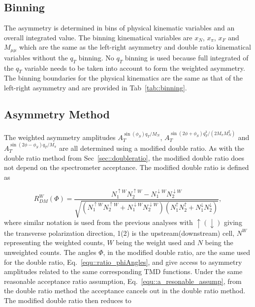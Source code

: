\subsection{Binning}
The asymmetry is determined in bins of physical kinematic variables and an
overall integrated value.  The binning kinematical variables are $x_N$, $x_\pi$,
$x_F$ and $M_{\mu\mu}$ which are the same as the left-right asymmetry and double
ratio kinematical variables without the $q_T$ binning.  No $q_T$ binning is used
because full integrated of the $q_T$ variable needs to be taken into account to
form the weighted asymmetry.  The binning boundaries for the physical kinematics
are the same as that of the left-right asymmetry and are provided in
Tab~\ref{tab::binning}.

\subsection{Asymmetry Method}
The weighted asymmetry amplitudes $A_T^{\sin(\phi_S) q_T/M_N}$,
$A_T^{\sin(2\phi+\phi_S) q^3_T/(2M_{\pi}M_N^2)}$ and $A_T^{\sin(2\phi-\phi_S)
  q_T/M_{\pi}}$ are all determined using a modified double ratio.  As with the
double ratio method from Sec~\ref{sec::doubleratio}, the modified double ratio
does not depend on the spectrometer acceptance.  The modified double ratio is
defined as

\begin{equation}
  \label{equ::modified_dr}
  R^W_{DM}(\Phi)=
  \frac{N^{\uparrow W}_{1}N^{\uparrow W}_{2}
    - N^{\downarrow W}_{1}N^{\downarrow W}_{2}}
       {\sqrt{(N^{\uparrow W}_{1}N^{\uparrow W}_{2}
         + N^{\downarrow W}_{1}N^{\downarrow W}_{2})
         (N^{\uparrow}_{1}N^{\uparrow}_{2}
         + N^{\downarrow}_{1}N^{\downarrow}_{2})}},
\end{equation}
\noindent
where similar notation is used from the previous analyses with
$\uparrow(\downarrow)$ giving the transverse polarization direction, 1(2) is the
upstream(downstream) cell, $N^{W}$ representing the weighted counts, $W$ being
the weight used and $N$ being the unweighted counts.  The angles $\Phi$, in the
modified double ratio, are the same used for the double ratio,
Eq.~\ref{equ::ratio_phiAngles}, and give access to asymmetry amplitudes related
to the same corresponding TMD functions.  Under the same reasonable acceptance
ratio assumption, Eq.~\ref{equ::a_resonable_assump}, from the double ratio
method the acceptance cancels out in the double ratio method.  The modified
double ratio then reduces to

